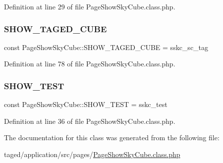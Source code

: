Definition at line 29 of file Page\+Show\+Sky\+Cube.\+class.\+php.

\mbox{\label{class_page_show_sky_cube_a0087499349f820d5bee3bc85e1b80ad8}} 
\subsubsection{\texorpdfstring{S\+H\+O\+W\+\_\+\+T\+A\+G\+E\+D\+\_\+\+C\+U\+BE}{SHOW\_TAGED\_CUBE}}
{\footnotesize\ttfamily const Page\+Show\+Sky\+Cube\+::\+S\+H\+O\+W\+\_\+\+T\+A\+G\+E\+D\+\_\+\+C\+U\+BE = \textquotesingle{}sskc\+\_\+sc\+\_\+tag\textquotesingle{}}



Definition at line 78 of file Page\+Show\+Sky\+Cube.\+class.\+php.

\mbox{\label{class_page_show_sky_cube_ac3bed91d4160b436bb2917b535f2a43b}} 
\subsubsection{\texorpdfstring{S\+H\+O\+W\+\_\+\+T\+E\+ST}{SHOW\_TEST}}
{\footnotesize\ttfamily const Page\+Show\+Sky\+Cube\+::\+S\+H\+O\+W\+\_\+\+T\+E\+ST = \textquotesingle{}sskc\+\_\+test\textquotesingle{}}



Definition at line 36 of file Page\+Show\+Sky\+Cube.\+class.\+php.



The documentation for this class was generated from the following file\+:\begin{DoxyCompactItemize}
\item 
taged/application/src/pages/\hyperlink{_page_show_sky_cube_8class_8php}{Page\+Show\+Sky\+Cube.\+class.\+php}\end{DoxyCompactItemize}
